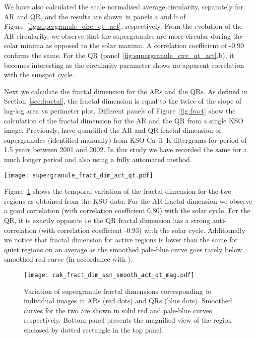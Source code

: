 \documentclass[manuscript]{aastex}	%
\begin{document}
We have also calculated the scale normalised average circularity, separately for AR and QR, and the results are shown in panels a and b of Figure~\ref{fig:supergranule_circ_qt_act}, respectively. From the evolution of the AR circularity, we observe that the supergranules are more circular during the solar minima as opposed to the solar maxima. A correlation coefficient of -0.90 confirms the same. For the QR (panel~\ref{fig:supergranule_circ_qt_act}.b), it becomes interesting as the circularity parameter shows no apparent correlation with the sunspot cycle.


Next we calculate the fractal dimension for the ARs and the QRs. As defined in Section~\ref{sec:fractal}, the fractal dimension is equal to the twice of the slope of log-log area vs perimeter plot. Different panels of Figure~\ref{fig:fract} show the calculation of the fractal dimension for the AR and the QR from a single KSO image. Previously, \citet{Paniveni11022010} have quantified the AR and QR fractal dimension of supergranules (identified manually) from KSO Ca~{\sc ii}~K filtergrams  for  period of 1.5 years between 2001 and 2002. In this study we have recorded the same for a much longer period and also using a fully automated method.

\begin{figure*}[!htbp]
  \centering
  \texttt{[image: supergranule\_fract\_dim\_act\_qt.pdf]}
  \caption{Calculation of fractal dimension of supergranules. a) Fractal dimension of supergranules in QRs; b) Fractal dimension of supergranules in ARs.}
 \label{fig:fract}
\end{figure*}

 Figure~\ref{fig:supergranule_fract_qt_act} shows the temporal variation of the fractal dimension for the two regions as obtained from the KSO data. For the AR fractal dimension we observe a good correlation (with correlation coefficient 0.80) with the solar cycle. For the QR, it is exactly opposite i.e the QR fractal dimension has a strong anti-correlation (with correlation coefficient -0.93) with the solar cycle. Additionally we notice that fractal dimension for active regions is lower than the same for quiet regions on an average as the smoothed pale-blue curve goes rarely below smoothed red curve (in accordance with \citet{Paniveni11022010}).

 \begin{figure}[!htbp]
 \centering
  \texttt{[image: cak\_fract\_dim\_ssn\_smooth\_act\_qt\_mag.pdf]}
  \caption{Variation of supergranule fractal dimensions corresponding to individual images in ARs (red dots) and QRs (blue dots). Smoothed curves for the two are shown in solid red and pale-blue curves respectively. Bottom panel presents the magnified view of the region enclosed by dotted rectangle in the top panel.}
 \label{fig:supergranule_fract_qt_act}
\end{figure}
\end{document}
